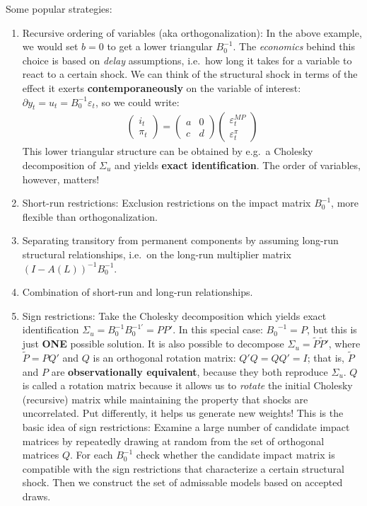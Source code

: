 \begin{enumerate}
Some popular strategies:
\begin{enumerate}
\item Recursive ordering of variables (aka orthogonalization):
In the above example, we would set \(b=0\) to get a lower triangular \(B_0^{-1}\).
The \emph{economics} behind this choice is based on \emph{delay} assumptions,
i.e.\ how long it takes for a variable to react to a certain shock.
We can think of the structural shock in terms of the effect it exerts \textbf{contemporaneously} on the variable of interest:
\(\partial y_t = u_t = B_0^{-1} \varepsilon_t\), so we could write:
\begin{align*}
\begin{pmatrix} i_t \\ \pi_t \end{pmatrix} = \begin{pmatrix} a & 0 \\ c & d \end{pmatrix} \begin{pmatrix} \varepsilon_t^{MP} \\ \varepsilon_t^{\pi} \end{pmatrix}
\end{align*}
This lower triangular structure can be obtained by e.g.\ a Cholesky decomposition of \(\Sigma_u\) and yields \textbf{exact identification}.
The order of variables, however, matters!
\item Short-run restrictions: Exclusion restrictions on the impact matrix \(B_0^{-1}\), more flexible than orthogonalization.
\item Separating transitory from permanent components by assuming long-run structural relationships,
i.e.\ on the long-run multiplier matrix \({(I-A(L))}^{-1} B_0^{-1}\).
\item Combination of short-run and long-run relationships.
\item Sign restrictions: Take the Cholesky decomposition which yields exact identification \(\Sigma_u = B_0^{-1}B_0^{-1'} = P P'\).
In this special case: \({B_0}^{-1}=P\), but this is just \textbf{ONE} possible solution.
It is also possible to decompose \(\Sigma_u = \tilde{P}\tilde{P}'\), where \(\tilde{P} = PQ'\) and \(Q\) is an orthogonal rotation matrix: \(Q'Q = QQ'=I\);
that is, \(\tilde{P}\) and \(P\) are \textbf{observationally equivalent}, because they both reproduce \(\Sigma_u\).
\(Q\) is called a rotation matrix because it allows us to \emph{rotate} the initial Cholesky (recursive) matrix while maintaining the property that shocks are uncorrelated.
Put differently, it helps us generate new weights!
This is the basic idea of sign restrictions:
Examine a large number of candidate impact matrices by repeatedly drawing at random from the set of orthogonal matrices \(Q\).
For each \(B_0^{-1}\) check whether the candidate impact matrix is compatible with the sign restrictions that characterize a certain structural shock.
Then we construct the set of admissable models based on accepted draws.
\end{enumerate}

\end{enumerate}